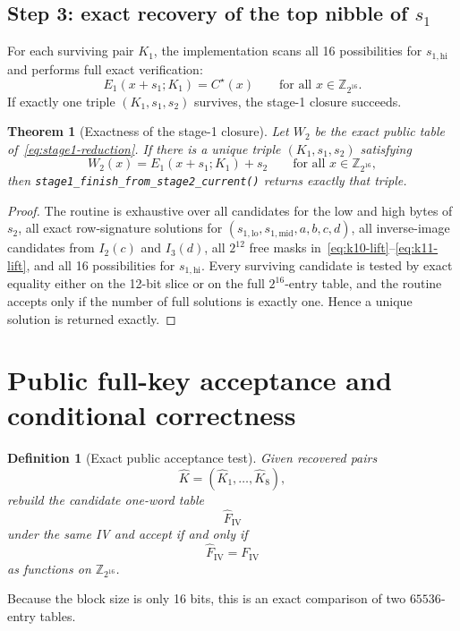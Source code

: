 \documentclass[11pt]{article}
\newtheorem{theorem}{Theorem}
\newtheorem{definition}{Definition}
\newcommand{\Z}[1]{\mathbb{Z}_{#1}}
\begin{document}
\subsection{Step 3: exact recovery of the top nibble of \texorpdfstring{$s_1$}{s1}}
For each surviving pair $K_1$, the implementation scans all 16 possibilities for $s_{1,\mathrm{hi}}$ and performs full exact verification:
\[
E_1(x+s_1;K_1)=C^\star(x)
\qquad\text{for all }x\in\Z{2^{16}}.
\]
If exactly one triple $(K_1,s_1,s_2)$ survives, the stage-1 closure succeeds.

\begin{theorem}[Exactness of the stage-1 closure]
\label{thm:stage1}
Let $W_2$ be the exact public table of~\eqref{eq:stage1-reduction}. If there is a unique triple $(K_1,s_1,s_2)$ satisfying
\[
W_2(x)=E_1(x+s_1;K_1)+s_2
\qquad\text{for all }x\in\Z{2^{16}},
\]
then \texttt{stage1\_finish\_from\_stage2\_current()} returns exactly that triple.
\end{theorem}

\begin{proof}
The routine is exhaustive over all candidates for the low and high bytes of $s_2$, all exact row-signature solutions for $(s_{1,\mathrm{lo}},s_{1,\mathrm{mid}},a,b,c,d)$, all inverse-image candidates from $I_2(c)$ and $I_3(d)$, all $2^{12}$ free masks in~\eqref{eq:k10-lift}--\eqref{eq:k11-lift}, and all 16 possibilities for $s_{1,\mathrm{hi}}$. Every surviving candidate is tested by exact equality either on the 12-bit slice or on the full $2^{16}$-entry table, and the routine accepts only if the number of full solutions is exactly one. Hence a unique solution is returned exactly.
\end{proof}

\section{Public full-key acceptance and conditional correctness}
\begin{definition}[Exact public acceptance test]
Given recovered pairs
\[
\widehat{K}=(\widehat{K}_1,\dots,\widehat{K}_8),
\]
rebuild the candidate one-word table
\[
\widehat{F}_{\mathrm{IV}}
\]
under the same IV and accept if and only if
\[
\widehat{F}_{\mathrm{IV}}=F_{\mathrm{IV}}
\]
as functions on $\Z{2^{16}}$.
\end{definition}

Because the block size is only 16 bits, this is an exact comparison of two $65536$-entry tables.
\end{document}
